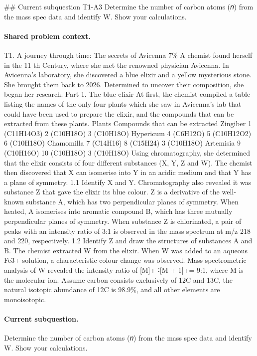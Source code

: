 \#\# Current subquestion T1-A3
Determine the number of carbon atoms (𝑛) from the mass spec data and identify W. Show your calculations.

\paragraph{Shared problem context.}
T1. A journey through time: The secrets of Avicenna 7\% A chemist found herself in the 11 th Century, where she met the renowned physician Avicenna. In Avicenna's laboratory, she discovered a blue elixir and a yellow mysterious stone. She brought them back to 2026. Determined to uncover their composition, she began her research. Part 1. The blue elixir At first, the chemist compiled a table listing the names of the only four plants which she saw in Avicenna’s lab that could have been used to prepare the elixir, and the compounds that can be extracted from these plants. Plants Compounds that can be extracted Zingiber 1 (C11H14O3) 2 (C10H18O) 3 (C10H18O) Hypericum 4 (C6H12O) 5 (C10H12O2) 6 (C10H18O) Chamomilla 7 (C14H16) 8 (C15H24) 3 (C10H18O) Artemisia 9 (C10H16O) 10 (C10H18O) 3 (C10H18O) Using chromatography, she determined that the elixir consists of four different substances (X, Y, Z and W). The chemist then discovered that X can isomerise into Y in an acidic medium and that Y has a plane of symmetry. 1.1 Identify X and Y. Chromatography also revealed it was substance Z that gave the elixir its blue colour. Z is a derivative of the well-known substance A, which has two perpendicular planes of symmetry. When heated, A isomerises into aromatic compound B, which has three mutually perpendicular planes of symmetry. When substance Z is chlorinated, a pair of peaks with an intensity ratio of 3:1 is observed in the mass spectrum at m/z 218 and 220, respectively. 1.2 Identify Z and draw the structures of substances A and B. The chemist extracted W from the elixir. When W was added to an aqueous Fe3+ solution, a characteristic colour change was observed. Mass spectrometric analysis of W revealed the intensity ratio of [M]+ ∶[M + 1]+= 9:1, where M is the molecular ion. Assume carbon consists exclusively of 12C and 13C, the natural isotopic abundance of 12C is 98.9\%, and all other elements are monoisotopic.

\paragraph{Current subquestion.}
Determine the number of carbon atoms (𝑛) from the mass spec data and identify W. Show your calculations.

